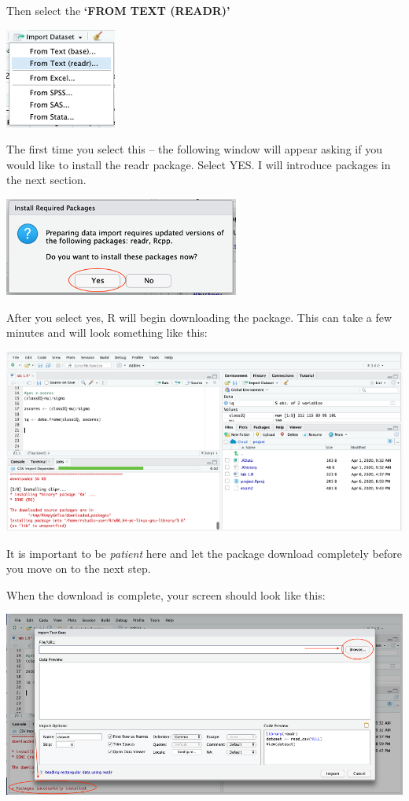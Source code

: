 \documentclass[
]{book}
\begin{document}
Then select the \textbf{`FROM TEXT (READR)'}

\includegraphics{img/readrbox.png}

The first time you select this -- the following window will appear asking if you would like to install the readr package. Select YES. I will introduce packages in the next section.

\includegraphics{img/installreadrbox.png}

After you select yes, R will begin downloading the package. This can take a few minutes and will look something like this:

\includegraphics{img/installreadr.png}

It is important to be \emph{patient} here and let the package download completely before you move on to the next step.

When the download is complete, your screen should look like this:

\includegraphics{img/importwindow.png}
\end{document}

